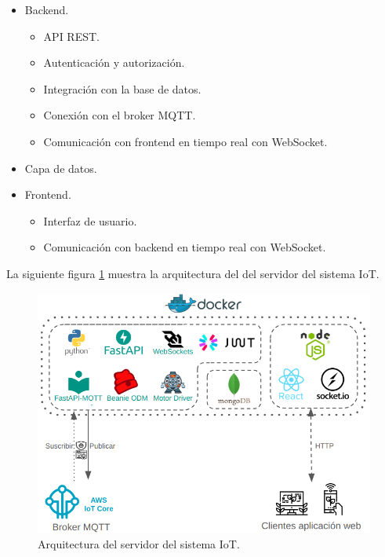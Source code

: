 \begin{itemize}
    \item Backend.
          \begin{itemize}
              \item API REST.
              \item Autenticación y autorización.
              \item Integración con la base de datos.
              \item Conexión con el broker MQTT.
              \item Comunicación con frontend en tiempo real con WebSocket.
          \end{itemize}
    \item Capa de datos.
    \item Frontend.
          \begin{itemize}
              \item Interfaz de usuario.
              \item Comunicación con backend en tiempo real con WebSocket.
          \end{itemize}
\end{itemize}

La siguiente figura \ref{fig:arquitectura servidor} muestra la arquitectura del
del servidor del sistema IoT.

\begin{figure}[H]
    \centering
    \includegraphics[width=.99\textwidth]{./Images/16.png}
    \caption{Arquitectura del servidor del sistema IoT.}
    \label{fig:arquitectura servidor}
\end{figure}

